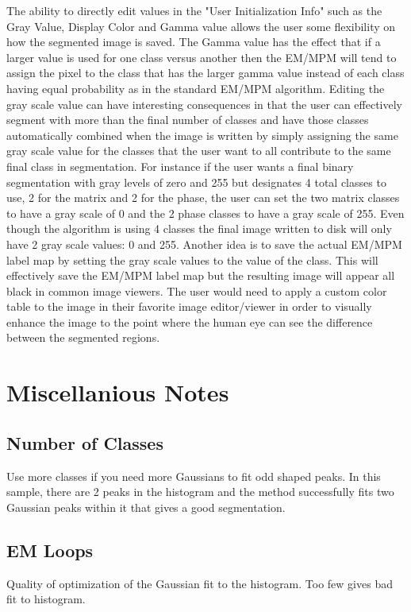 \documentclass[12pt,oneside]{book}
\begin{document}
The ability to directly edit values in the "User Initialization Info" such as the Gray Value, Display Color and Gamma value allows the user some flexibility on how the segmented image is saved. The Gamma value has the effect that if a larger value is used for one class versus another then the EM/MPM will tend to assign the pixel to the class that has the larger gamma value instead of each class having equal probability as in the standard EM/MPM algorithm. Editing the gray scale value can have interesting consequences in that the user can effectively segment with more than the final number of classes and have those classes automatically combined when the image is written by simply assigning the same gray scale value for the classes that the user want to all contribute to the same final class in segmentation. For instance if the user wants a final binary segmentation with gray levels of zero and 255 but designates 4 total classes to use, 2 for the matrix and 2 for the phase, the user can set the two matrix classes to have a gray scale of 0 and the 2 phase classes to have a gray scale of 255. Even though the algorithm is using 4 classes the final image written to disk will only have 2 gray scale values: 0 and 255.
 	Another idea is to save the actual EM/MPM label map by setting the gray scale values to the value of the class. This will effectively save the EM/MPM label map but the resulting image will appear all black in common image viewers. The user would need to apply a custom color table to the image in their favorite image editor/viewer in order to visually enhance the image to the point where the human eye can see the difference between the segmented regions.

\chapter{Miscellanious Notes}
\section{Number of Classes}
Use more classes if you need more Gaussians to fit odd shaped peaks. In this sample, there are 2 peaks in the histogram and the method successfully fits two Gaussian peaks within it that gives a good segmentation.
\section{EM Loops}
Quality of optimization of the Gaussian fit to the histogram. Too few gives bad fit to histogram.
\end{document}
